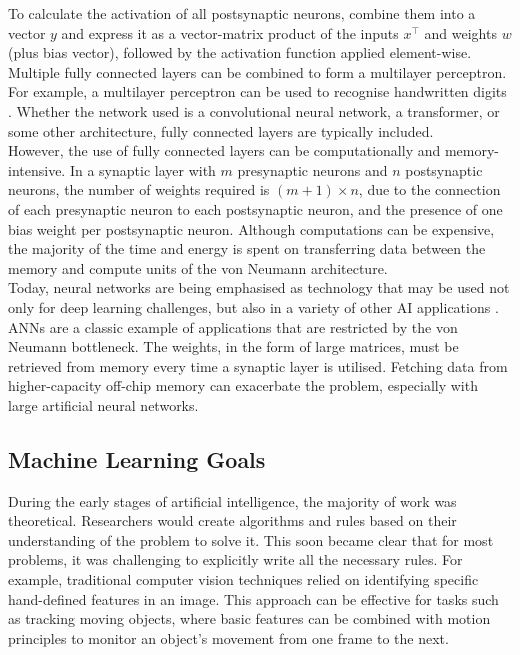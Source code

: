 \noindent To calculate the activation of all postsynaptic neurons, combine them into a vector $y$ and express it as a vector-matrix product of the inputs $x^{\intercal}$ and weights $w$ (plus bias vector), followed by the activation function applied element-wise. Multiple fully connected layers can be combined to form a multilayer perceptron. For example, a multilayer perceptron can be used to recognise handwritten digits \cite{pal2010handwritten}. Whether the network used is a convolutional neural network, a transformer, or some other architecture, fully connected layers are typically included.\\

\noindent However, the use of fully connected layers can be computationally and memory-intensive. In a synaptic layer with $m$ presynaptic neurons and $n$ postsynaptic neurons, the number of weights required is $(m + 1) \times n$, due to the connection of each presynaptic neuron to each postsynaptic neuron, and the presence of one bias weight per postsynaptic neuron. Although computations can be expensive, the majority of the time and energy is spent on transferring data between the memory and compute units of the von Neumann architecture. \\

\noindent Today, neural networks are being emphasised as technology that may be used not only for deep learning challenges, but also in a variety of other AI applications \cite{zbontar2016stereo}. ANNs are a classic example of applications that are restricted by the von Neumann bottleneck. The weights, in the form of large matrices, must be retrieved from memory every time a synaptic layer is utilised. Fetching data from higher-capacity off-chip memory can exacerbate the problem, especially with large artificial neural networks.

\subsection[Machine Learning Goals]{Machine Learning Goals}

During the early stages of artificial intelligence, the majority of work was theoretical. Researchers would create algorithms and rules based on their understanding of the problem to solve it. This soon became clear that for most problems, it was challenging to explicitly write all the necessary rules. For example, traditional computer vision techniques relied on identifying specific hand-defined features in an image. This approach can be effective for tasks such as tracking moving objects, where basic features can be combined with motion principles to monitor an object's movement from one frame to the next. \\

